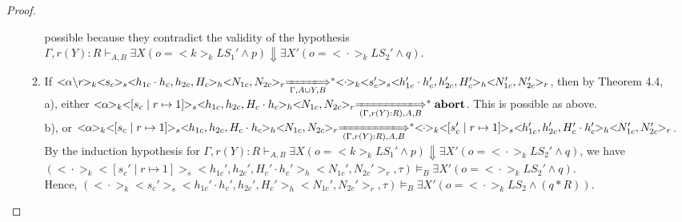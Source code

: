 \documentclass{lmcs} %
\theoremstyle{plain}\newtheorem{satz}[thm]{Satz} %
\begin{document}
\begin{proof}
\begin{itemize}
\begin{enumerate}
             possible because they contradict the validity of the hypothesis $\Gamma,r(Y):R \vdash_{A,B} \exists X(o=<\!\!k\!\!>_k LS_1'\land p )\Downarrow \exists X'(o=<\!\!\cdot\!\!>_k LS_2'\land q)$.
         \item If $<\!\!\alpha\backslash r\!\!>_k<\!\!s_c\!\!>_s<\!\!h_{1c}\cdot h_c,h_{2c},H_c\!\!>_h<\!\!N_{1c},N_{2c}\!\!>_r\xLongrightarrow[\Gamma, A\cup Y, B]{}^*<\!\!\cdot\!\!>_k<\!\!s_c'\!\!>_s<\!\!h_{1c}'\cdot h_c',h_{2c}',H_c'\!\!>_h<\!\!N_{1c}',N_{2c}'\!\!>_r$, then by Theorem 4.4,\\
              a), either $<\!\!\alpha\!\!>_k<\!\![s_c\mid r\mapsto 1]\!\!>_s<\!\!h_{1c},h_{2c},H_c\cdot h_c\!\!>_h<\!\!N_{1c},N_{2c}\!\!>_r\xLongrightarrow[(\Gamma,r(Y):R), A, B]{}^*\mathbf{abort}$. This is
             possible as above.\\
              b), or $<\!\!\alpha\!\!>_k<\!\![s_c\mid r\mapsto 1]\!\!>_s<\!\!h_{1c},h_{2c},H_c\cdot h_c\!\!>_h<\!\!N_{1c},N_{2c}\!\!>_r\xLongrightarrow[(\Gamma,r(Y):R), A, B]{}^*<\!\!\cdot\!\!>_k<\!\![s_c'\mid r\mapsto 1]\!\!>_s<\!\!h_{1c}',h_{2c}',H_c'\cdot h_c'\!\!>_h<\!\!N_{1c}',N_{2c}'\!\!>_r$.\\
              By the induction hypothesis for $\Gamma,r(Y):R \vdash_{A,B} \exists X(o=<\!\!k\!\!>_k LS_1'\land p )\Downarrow \exists X'(o=<\!\!\cdot\!\!>_k LS_2'\land q)$, we have $(<\!\!\cdot\!\!>_k<\!\![s_c'\mid r\mapsto 1]\!\!>_s<\!\!h_{1c}',h_{2c}',H_c'\cdot h_c'\!\!>_h<\!\!N_{1c}',N_{2c}'\!\!>_r,\tau)\models_{B} \exists X'(o=<\!\!\cdot\!\!>_k LS_2'\land q)$.\\
              Hence, $(<\!\!\cdot\!\!>_k<\!\!s_c'\!\!>_s<\!\!h_{1c}'\cdot h_c',h_{2c}',H_c'\!\!>_h<\!\!N_{1c}',N_{2c}'\!\!>_r,\tau)\models_{B} \exists X'(o=<\!\!\cdot\!\!>_k LS_2\land (q\ast R))$.
       \end{enumerate}
\end{itemize}
\end{proof}
\end{document}
